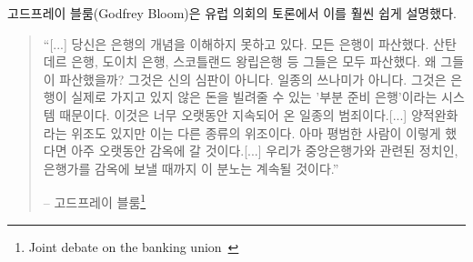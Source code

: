 \begin{comment}
Godfrey Bloom, addressing the European Parliament during a joint
debate, said it way better than I ever could:
\end{comment}
고드프레이 블룸(Godfrey Bloom)은 유럽 의회의 토론에서 이를 훨씬 쉽게 설명했다.

\begin{comment}
\begin{quotation}\begin{samepage}
\enquote{[...] you do not really understand the concept of banking. All the
banks are broke. Bank Santander, Deutsche Bank, Royal Bank of
Scotland --- they're all broke! And why are they broke? It isn't an
act of God. It isn't some sort of tsunami. They're broke because we
have a system called `fractional reserve banking' which means that
banks can lend money that they don't actually have! It's a criminal
scandal and it's been going on for too long. [...]
We have counterfeiting --- sometimes called quantitative
easing --- but counterfeiting by any other name. The artificial
printing of money which, if any ordinary person did, they'd go to
prison for a very long time [...] and until we start sending
bankers --- and I include central bankers and politicians --- to
prison for this outrage it will continue.}
\begin{flushright} -- Godfrey Bloom\footnote{Joint debate on the
banking union~\cite{godfrey-bloom}}
\end{flushright}\end{samepage}\end{quotation}
\end{comment}
\begin{quotation}\begin{samepage}
\enquote{[...] 당신은 은행의 개념을 이해하지 못하고 있다. 
	모든 은행이 파산했다. 산탄데르 은행, 도이치 은행, 스코틀랜드 왕립은행 등 그들은 모두 파산했다.
	왜 그들이 파산했을까? 그것은 신의 심판이 아니다. 일종의 쓰나미가 아니다. 
	그것은 은행이 실제로 가지고 있지 않은 돈을 빌려줄 수 있는
	'부분 준비 은행'이라는 시스템 때문이다. 
	이것은 너무 오랫동안 지속되어 온 일종의 범죄이다.[...]	
	양적완화라는 위조도 있지만 이는 다른 종류의 위조이다.
	아마 평범한 사람이 이렇게 했다면 아주 오랫동안 감옥에 갈 것이다.[...] 
	우리가 중앙은행가와 관련된 정치인, 은행가를 감옥에 보낼 때까지
	이 분노는 계속될 것이다.}
\begin{flushright} -- 고드프레이 블룸\footnote{Joint debate on the
banking union~\cite{godfrey-bloom}}
\end{flushright}\end{samepage}\end{quotation}

